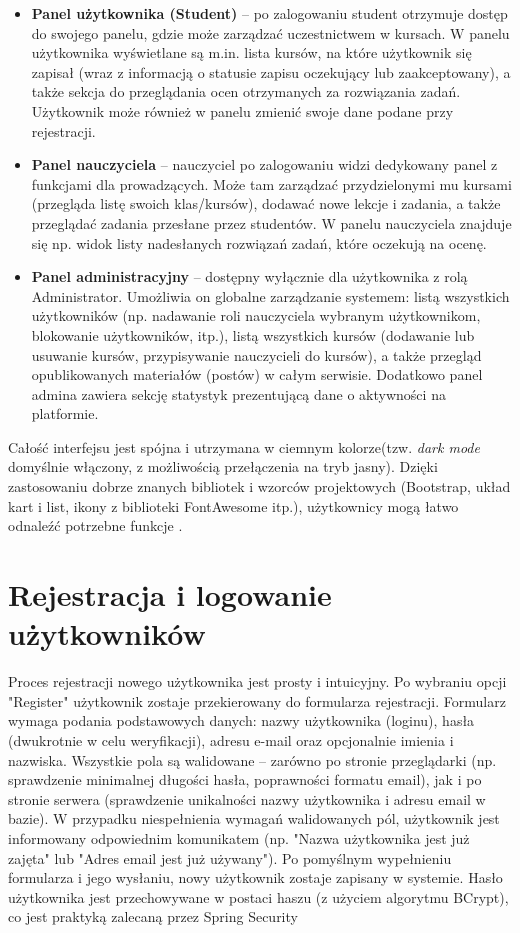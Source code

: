 \begin{itemize}
\item \textbf{Panel użytkownika (Student)} – po zalogowaniu student otrzymuje dostęp do swojego panelu, gdzie może zarządzać uczestnictwem w kursach. W panelu użytkownika wyświetlane są m.in. lista kursów, na które użytkownik się zapisał (wraz z informacją o statusie zapisu oczekujący lub zaakceptowany), a także sekcja do przeglądania ocen otrzymanych za rozwiązania zadań.
Użytkownik może również w panelu zmienić swoje dane podane przy rejestracji.
\item \textbf{Panel nauczyciela} – nauczyciel po zalogowaniu widzi dedykowany panel z funkcjami dla prowadzących. Może tam zarządzać przydzielonymi mu kursami (przegląda listę swoich klas/kursów), dodawać nowe lekcje i zadania, a także przeglądać zadania przesłane przez studentów. W panelu nauczyciela znajduje się np. widok listy nadesłanych rozwiązań zadań, które oczekują na ocenę.
\item \textbf{Panel administracyjny} – dostępny wyłącznie dla użytkownika z rolą Administrator. Umożliwia on globalne zarządzanie systemem: listą wszystkich użytkowników (np. nadawanie roli nauczyciela wybranym użytkownikom, blokowanie użytkowników, itp.), listą wszystkich kursów (dodawanie lub usuwanie kursów, przypisywanie nauczycieli do kursów), a także przegląd opublikowanych materiałów (postów) w całym serwisie. Dodatkowo panel admina zawiera sekcję statystyk prezentującą dane o aktywności na platformie.
\end{itemize} Całość interfejsu jest spójna i utrzymana w ciemnym kolorze(tzw. \textit{dark mode} domyślnie włączony, z możliwością przełączenia na tryb jasny). Dzięki zastosowaniu dobrze znanych bibliotek i wzorców projektowych (Bootstrap, układ kart i list, ikony z biblioteki FontAwesome itp.), użytkownicy mogą łatwo odnaleźć potrzebne funkcje \cite{bootstrap-docs}. \section{Rejestracja i logowanie użytkowników} Proces rejestracji nowego użytkownika jest prosty i intuicyjny. Po wybraniu opcji "Register" użytkownik zostaje przekierowany do formularza rejestracji. Formularz wymaga podania podstawowych danych: nazwy użytkownika (loginu), hasła (dwukrotnie w celu weryfikacji), adresu e-mail oraz opcjonalnie imienia i nazwiska. Wszystkie pola są walidowane – zarówno po stronie przeglądarki (np. sprawdzenie minimalnej długości hasła, poprawności formatu email), jak i po stronie serwera (sprawdzenie unikalności nazwy użytkownika i adresu email w bazie). W przypadku niespełnienia wymagań walidowanych pól, użytkownik jest informowany odpowiednim komunikatem (np. "Nazwa użytkownika jest już zajęta" lub "Adres email jest już używany"). Po pomyślnym wypełnieniu formularza i jego wysłaniu, nowy użytkownik zostaje zapisany w systemie. Hasło użytkownika jest przechowywane w postaci haszu (z użyciem algorytmu BCrypt), co jest praktyką zalecaną przez Spring Security \cite{spring-security-in-action-2e}
